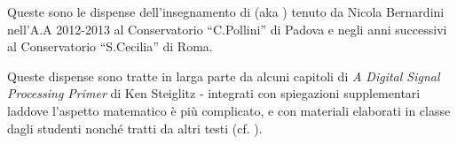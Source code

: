 %
%

Queste sono le dispense dell'insegnamento di \emph{\topic}
(aka \emph{\topicacro}) tenuto da Nicola Bernardini nell'A.A 2012-2013 al
Conservatorio ``C.Pollini'' di Padova
e negli anni successivi al Conservatorio ``S.Cecilia'' di Roma.

Queste dispense sono tratte in larga parte da alcuni capitoli di \emph{A Digital Signal Processing Primer}
di Ken Steiglitz \cite{steiglitz:adspp} - integrati
con spiegazioni supplementari laddove l'aspetto matematico \`e pi\`u
complicato, e con materiali elaborati in
classe dagli studenti
nonch\'e tratti da altri testi
(cf. \cite{steiglitz1974, t1987digital, park2010, shenoi2005}).

